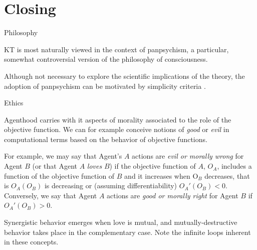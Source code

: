 \section{Closing}




\begin{frame}[label=ladila]{Philosophy}

KT is most naturally viewed in the context of panpsychism, a particular, somewhat controversial version of the philosophy of consciousness.  \vfill

 Although not necessary to explore the scientific implications of the theory, the adoption of panpsychism can be  motivated by simplicity criteria \citep{Symes2022-ri}.
 
\end{frame}




\begin{frame}[label=ladila]{Ethics}

 Agenthood carries with it aspects of morality associated to the role of the objective function. We can for example conceive notions of {\em good} or {\em evil} in computational terms based on the behavior of objective functions. \vfill
 
 For example, we may say that Agent's $A$ actions are {\em evil or morally wrong} for Agent $B$ (or that Agent $A$ {\em loves} $B$) if the objective function of $A$, $O_A$, includes a function of the objective function of $B$ and it increases when O$_B$ decreases, that is $O_A(O_B)$ is decreasing or (assuming differentiability) $O_A'(O_B) <0$. Conversely, we say that Agent $A$ actions are {\em good or morally right} for Agent $B$ if $O_A'(O_B) >0$. \vfill 

Synergistic behavior emerges when love is mutual, and mutually-destructive behavior takes place in the complementary case. Note the infinite loops inherent in these concepts. 
 
\end{frame}